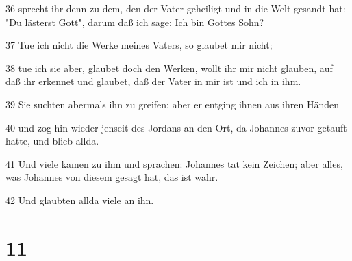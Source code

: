 \par 36 sprecht ihr denn zu dem, den der Vater geheiligt und in die Welt gesandt hat: "Du lästerst Gott", darum daß ich sage: Ich bin Gottes Sohn?
\par 37 Tue ich nicht die Werke meines Vaters, so glaubet mir nicht;
\par 38 tue ich sie aber, glaubet doch den Werken, wollt ihr mir nicht glauben, auf daß ihr erkennet und glaubet, daß der Vater in mir ist und ich in ihm.
\par 39 Sie suchten abermals ihn zu greifen; aber er entging ihnen aus ihren Händen
\par 40 und zog hin wieder jenseit des Jordans an den Ort, da Johannes zuvor getauft hatte, und blieb allda.
\par 41 Und viele kamen zu ihm und sprachen: Johannes tat kein Zeichen; aber alles, was Johannes von diesem gesagt hat, das ist wahr.
\par 42 Und glaubten allda viele an ihn.

\chapter{11}

